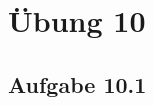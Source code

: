 \documentclass{standalone}
\begin{document}
\section{Übung 10}
\subsection{Aufgabe 10.1}
\end{document}
